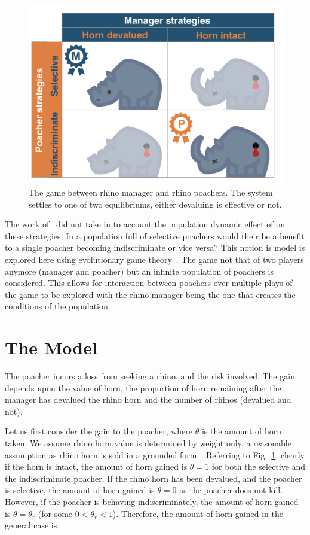 \documentclass[10pt]{article}
\begin{document}
\begin{figure}[!htbp]
	\centering
	\includegraphics[scale=0.2]{images/RhinoPic.pdf}
	\caption{\label{fig:RhinoPic} The game between rhino manager and rhino 
	poachers. The system settles to one of two equilibriums, either devaluing is effective or not.}
\end{figure}

The work of~\cite{Lee} did not take in to account the population dynamic effect
of on these strategies. In a population full of selective poachers would their be 
a benefit to a single poacher becoming indiscriminate or vice versa? This notion 
is model is explored here using evolutionary game theory~\cite{Smith}. The 
game not that of two players anymore (manager and poacher) but an infinite
population of poachers is considered. This allows for interaction between poachers
over multiple plays of the game to be explored with the rhino manager being the
one that creates the conditions of the population. 

\section{The Model}\label{section:the_model}

The poacher incurs a loss from seeking a rhino, and the risk involved. The gain 
depends upon the value of horn, the proportion of horn remaining after the 
manager has devalued the rhino horn and the number of rhinos (devalued and
not).

Let us first consider the gain to the poacher, where \(\theta\) is the amount of 
horn taken. We assume rhino horn value is determined by weight only, a 
reasonable assumption as rhino horn is sold in a grounded form~\cite{Saverhino}.
Referring to Fig.~\ref{fig:RhinoPic}, clearly if the horn is intact, the amount of
horn gained is \(\theta=1\) for both the selective and the indiscriminate poacher.
If the rhino horn has been devalued, and the poacher is selective, the amount of horn 
gained is \(\theta=0\) as the poacher does not kill. However, if the poacher is 
behaving indiscriminately, the amount of horn gained is \(\theta = \theta_r\)
(for some \(0<\theta_r<1\)). 
Therefore, the amount of horn gained in the general case is
\end{document}
